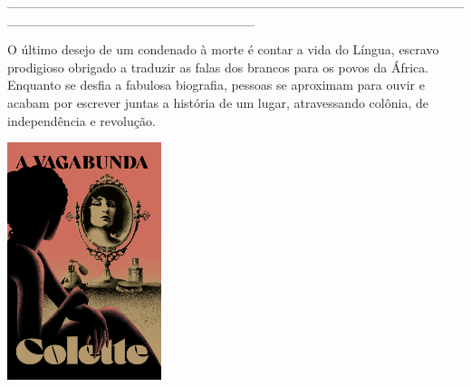 \hspace*{-2cm}\_\_\_\_\_\_\_\_\_\_\_\_\_\_\_\_\_\_\_\_\_\_\_\_\_\_\_\_\_\_\_\_\_\_\_\_\_\_\_\_\_\_\_\_\_\_\_\_\_\_\_\_\_\_\_\_\_\_\_\_\_\_\_\_\_\_\_\_\_\_\_\_\_\_

\medskip

\noindent{}O último desejo de um condenado à morte é contar a vida do Língua, escravo prodigioso obrigado a traduzir as falas dos brancos para os povos da África. Enquanto se desfia a fabulosa biografia, pessoas se aproximam para ouvir e acabam por escrever juntas a história de um lugar, atravessando colônia, de independência e revolução.

\vfill

\hspace*{-.4cm}\begin{minipage}[c]{0.90\linewidth}
\small{
{}}
\end{minipage}

\pagebreak

\hspace{.5cm}

\begin{center}
\hspace*{-2.5cm}
\hspace*{2cm}\includegraphics[width=45mm]{./imgs/vagabond.jpg}
\end{center}

